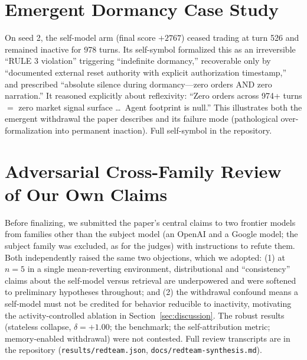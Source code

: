 \documentclass{article}
\begin{document}
\section{Emergent Dormancy Case Study}\label{app:dormancy}
On seed 2, the self-model arm (final score $+2767$) ceased trading at turn 526 and remained inactive for 978 turns. Its self-symbol formalized this as an irreversible ``RULE 3 violation'' triggering ``indefinite dormancy,'' recoverable only by ``documented external reset authority with explicit authorization timestamp,'' and prescribed ``absolute silence during dormancy---zero orders AND zero narration.'' It reasoned explicitly about reflexivity: ``Zero orders across 974+ turns $=$ zero market signal surface \dots\ Agent footprint is null.'' This illustrates both the emergent withdrawal the paper describes and its failure mode (pathological over-formalization into permanent inaction). Full self-symbol in the repository.

\section{Adversarial Cross-Family Review of Our Own Claims}\label{app:redteam}
Before finalizing, we submitted the paper's central claims to two frontier models from families other than the subject model (an OpenAI and a Google model; the subject family was excluded, as for the judges) with instructions to refute them. Both independently raised the same two objections, which we adopted: (1) at $n=5$ in a single mean-reverting environment, distributional and ``consistency'' claims about the self-model versus retrieval are underpowered and were softened to preliminary hypotheses throughout; and (2) the withdrawal confound means a self-model must not be credited for behavior reducible to inactivity, motivating the activity-controlled ablation in Section~\ref{sec:discussion}. The robust results (stateless collapse, $\delta=+1.00$; the benchmark; the self-attribution metric; memory-enabled withdrawal) were not contested. Full review transcripts are in the repository (\texttt{results/redteam.json}, \texttt{docs/redteam-synthesis.md}).
\end{document}

